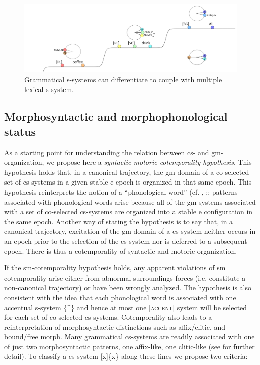 \begin{enumerate}
  
\begin{figure}
\includegraphics[width=\textwidth]{figures/Tilsen-img67.png}
\caption{Grammatical s-systems can differentiate to couple with multiple lexical s-system.}
\label{fig:4:17}
\end{figure}
\end{enumerate}
 

\subsection{Morphosyntactic and morphophonological status}

As a starting point for understanding the relation between cs- and gm-organization, we propose here a \textit{syntactic-motoric cotemporality hypothesis}. This hypothesis holds that, in a canonical trajectory, the gm-domain of a co-selected set of cs-systems in a given stable e-epoch is organized in that same epoch. This hypothesis reinterprets the notion of a “phonological word” (cf. \citealt{NesporVogel1986}, \citealt{Selkirk1984,Selkirk2011};: patterns associated with phonological words arise because all of the gm-systems associated with a set of co-selected cs-systems are organized into a stable e configuration in the same epoch. Another way of stating the hypothesis is to say that, in a canonical trajectory, excitation of the gm-domain of a cs-system neither occurs in an epoch prior to the selection of the cs-system nor is deferred to a subsequent epoch. There is thus a cotemporality of syntactic and motoric organization. 

  If the sm-cotemporality hypothesis holds, any apparent violations of sm cotemporality arise either from abnormal surroundings forces (i.e. constitute a non-canonical trajectory) or have been wrongly analyzed. The hypothesis is also consistent with the idea that each phonological word is associated with one accentual s-system \{\^{}\} and hence at most one [\textsc{accent}] system will be selected for each set of co-selected cs-systems. Cotemporality also leads to a reinterpretation of morphosyntactic distinctions such as affix/clitic, and bound/free morph. Many grammatical cs-systems are readily associated with one of just two morphosyntactic patterns, one affix-like, one clitic-like (see \citealt{Payne1997,Zwicky1985,ZwickyPullum1983} for further detail). To classify a cs-system [x]\{x\} along these lines we propose two criteria:

